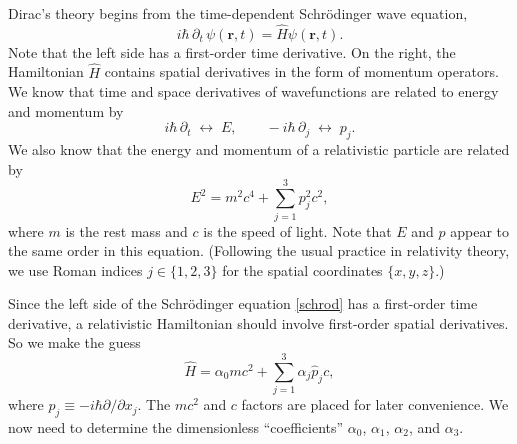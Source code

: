 \documentclass[pra,12pt]{revtex4}
\begin{document}
Dirac's theory begins from the time-dependent Schr\"odinger wave
equation,
\begin{equation}
  i\hbar\, \partial_t\, \psi(\mathbf{r},t)
  = \hat{H} \psi(\mathbf{r},t).
  \label{schrod}
\end{equation}
Note that the left side has a first-order time derivative.  On the
right, the Hamiltonian $\hat{H}$ contains spatial derivatives in the
form of momentum operators.  We know that time and space derivatives
of wavefunctions are related to energy and momentum by
\begin{equation}
    i\hbar\, \partial_t\; \leftrightarrow \;
    E, \qquad
    -i\hbar\, \partial_j \;\leftrightarrow \;
    p_j.
\end{equation}
We also know that the energy and momentum of a relativistic particle
are related by
\begin{equation}
  E^2 = m^2c^4 + \sum_{j=1}^3 p_j^2c^2,
  \label{Erelativistic}
\end{equation}
where $m$ is the rest mass and $c$ is the speed of light.  Note that
$E$ and $p$ appear to the same order in this equation.  (Following the
usual practice in relativity theory, we use Roman indices $j \in
\{1,2,3\}$ for the spatial coordinates $\{x,y,z\}$.)

Since the left side of the Schr\"odinger equation \eqref{schrod} has a
first-order time derivative, a relativistic Hamiltonian should involve
first-order spatial derivatives.  So we make the guess
\begin{equation}
  \hat{H} = \alpha_0 mc^2 + \sum_{j=1}^3 \alpha_j \hat{p}_j c,
  \label{Dirac0}
\end{equation}
where $\hat{p}_j \equiv -i\hbar \partial/\partial x_j$.  The $mc^2$
and $c$ factors are placed for later convenience.  We now need to
determine the dimensionless ``coefficients'' $\alpha_0$, $\alpha_1$,
$\alpha_2$, and $\alpha_3$.
\end{document}
